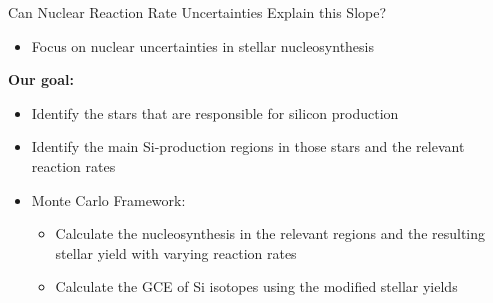 \documentclass[10pt]{beamer}
\begin{document}
\begin{frame}{Can Nuclear Reaction Rate Uncertainties Explain this Slope?}
    \begin{itemize}
    \setlength\itemsep{2em}
        \item Focus on nuclear uncertainties in stellar nucleosynthesis 
    \end{itemize}
    \textbf{Our goal:}
    \begin{itemize}
    \setlength\itemsep{2em}
        \item Identify the stars that are responsible for silicon production
        \item Identify the main Si-production regions in those stars and the relevant reaction rates
        \item Monte Carlo Framework:
        \begin{itemize}
            \item Calculate the nucleosynthesis in the relevant regions and the resulting stellar yield with varying reaction rates
            \item Calculate the GCE of Si isotopes using the modified stellar yields
        \end{itemize}
        
    \end{itemize}
    
\end{frame}
\end{document}

